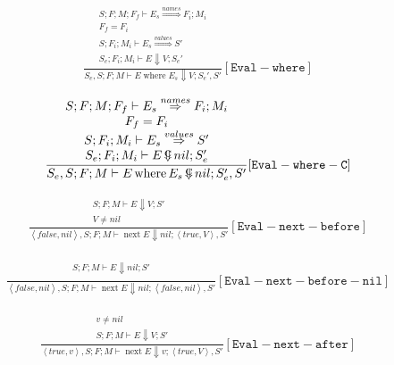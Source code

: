 \documentclass{scrartcl}
\DeclareMathOperator{\where}{where}
\DeclareMathOperator{\nextop}{next}
\DeclareMathOperator{\ceval}{\overset{C}{\smash{\Downarrow}}}
\begin{document}
    \begin{align*}
    \frac{
        \begin{matrix}
        S; F; M; F_f \vdash E_s \overset{names}{\Rightarrow} F_i; M_i \\
        F_f = F_i \\
        S; F_i; M_i \vdash E_s \overset{values}{\Rightarrow} S' \\
        S_e; F_i; M_i \vdash E \Downarrow V; S_e'        
        \end{matrix}
    }{
        S_e, S; F; M \vdash E \where E_s \Downarrow V; S_e', S'
    }[\mathtt{Eval-where}]
    \end{align*}
    
    \begin{align*}
    \frac{
        \begin{matrix}
        S; F; M; F_f \vdash E_s \overset{names}{\Rightarrow} F_i; M_i \\
        F_f = F_i \\
        S; F_i; M_i \vdash E_s \overset{values}{\Rightarrow} S' \\
        S_e; F_i; M_i \vdash E  \ceval nil; S_e'        
        \end{matrix}
    }{
        S_e, S; F; M \vdash E \where E_s \ceval nil; S_e', S'
    }[\mathtt{Eval-where-C}]
    \end{align*}
   
    
    \begin{align*}
    \frac{
        \begin{matrix}
        S; F; M \vdash E \Downarrow V; S' \\
        V \neq nil
        \end{matrix}
    }{
        \left<false, nil \right>, S; F; M \vdash \nextop E \Downarrow nil; \left< true, V \right>, S'
    }[\mathtt{Eval-next-before}]
    \end{align*}
    
    \begin{align*}
    \frac{
        \begin{matrix}
        S; F; M \vdash E \Downarrow nil; S' \\
        \end{matrix}
    }{
        \left<false, nil \right>, S; F; M \vdash \nextop E \Downarrow nil; \left< false, nil \right>, S'
    }[\mathtt{Eval-next-before-nil}]
    \end{align*}
    
    \begin{align*}
    \frac{
        \begin{matrix}
        v \neq nil \\
        S; F; M \vdash E \Downarrow V; S'
        \end{matrix}
    }{
        \left<true, v \right>, S; F; M \vdash \nextop E  \Downarrow v; \left< true, V \right>, S'
    }[\mathtt{Eval-next-after}]
    \end{align*}
    
\end{document}
